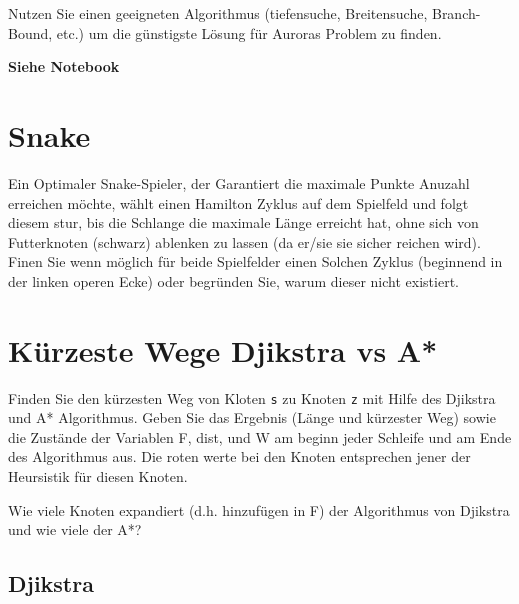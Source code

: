 \documentclass[a4paper,11pt]{report}
\begin{document}
    Nutzen Sie einen geeigneten Algorithmus (tiefensuche, Breitensuche, Branch-Bound, etc.) um die günstigste Lösung für Auroras Problem zu finden.

    \textbf{Siehe Notebook}

    \chapter{Snake}

    Ein Optimaler Snake-Spieler, der Garantiert die maximale Punkte Anuzahl erreichen möchte, wählt einen Hamilton Zyklus auf dem Spielfeld und folgt diesem stur, bis die Schlange die maximale Länge erreicht hat, ohne sich von Futterknoten (schwarz) ablenken zu lassen (da er/sie sie sicher reichen wird).
    Finen Sie wenn möglich für beide Spielfelder einen Solchen Zyklus (beginnend in der linken operen Ecke) oder begründen Sie, warum dieser nicht existiert.

    \newpage

    \chapter{Kürzeste Wege Djikstra vs A*}

    Finden Sie den kürzesten Weg von Kloten \texttt{s} zu Knoten \texttt{z} mit Hilfe des Djikstra und A* Algorithmus.
    Geben Sie das Ergebnis (Länge und kürzester Weg) sowie die Zustände der Variablen F, dist, und W am beginn jeder Schleife und am Ende des Algorithmus aus.
    Die roten werte bei den Knoten entsprechen jener der Heursistik für diesen Knoten.

    Wie viele Knoten expandiert (d.h. hinzufügen in F) der Algorithmus von Djikstra und wie viele der A*?

    \section{Djikstra}\label{sec:djikstra}
\end{document}
